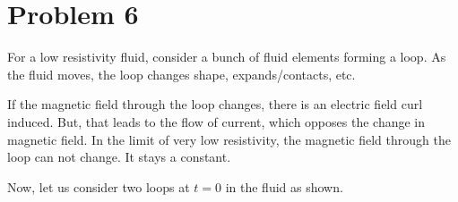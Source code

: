 \documentclass[11pt,a4paper]{scrartcl}
\begin{document}
\section{Problem 6}
\begin{solution}
For a low resistivity fluid, consider a bunch of fluid elements forming a loop. As the fluid moves, the loop changes shape, expands/contacts, etc.\par
If the magnetic field through the loop changes, there is an electric field curl induced. But, that leads to the flow of current, which opposes the change in magnetic field. In the limit of very low resistivity, the magnetic field through the loop can not change. It stays a constant.\par
Now, let us consider two loops at $t=0$ in the fluid as shown.\par
\begin{center}

\begin{tikzpicture}[x=0.75pt,y=0.75pt,yscale=-1,xscale=1]


\end{tikzpicture}
\end{center}
\end{solution}
\end{document}
